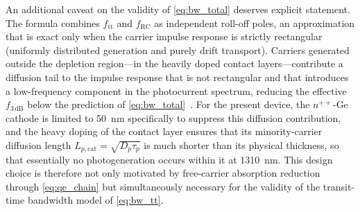 An additional caveat on the validity of \cref{eq:bw_total} deserves explicit
statement. The formula combines $f_{\mathrm{tt}}$ and $f_{\mathrm{RC}}$ as
independent roll-off poles, an approximation that is exact only when the carrier
impulse response is strictly rectangular (uniformly distributed generation and
purely drift transport). Carriers generated outside the depletion region—in the
heavily doped contact layers—contribute a diffusion tail to the impulse
response that is not rectangular and that introduces a low-frequency component
in the photocurrent spectrum, reducing the effective $f_{3\,\mathrm{dB}}$ below
the prediction of \cref{eq:bw_total}~\cite{Yan2024}. For the present device,
the $n^{++}$-Ge cathode is limited to \SI{50}{\nano\metre} specifically to
suppress this diffusion contribution, and the heavy doping of the contact layer
ensures that its minority-carrier diffusion length $L_{p,\mathrm{cat}}
= \sqrt{D_p\tau_p}$ is much shorter than its physical thickness, so that
essentially no photogeneration occurs within it at \SI{1310}{\nano\metre}.
This design choice is therefore not only motivated by free-carrier absorption
reduction through \cref{eq:qe_chain} but simultaneously necessary for the
validity of the transit-time bandwidth model of \cref{eq:bw_tt}.



